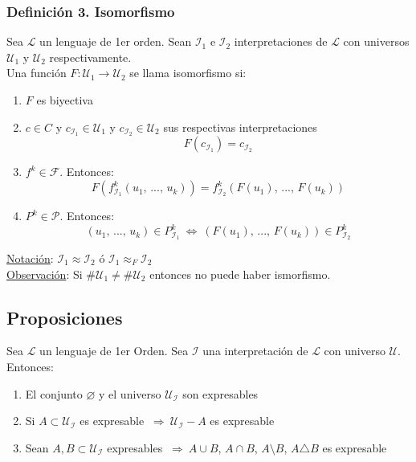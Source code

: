 \documentclass{article}
\newcommand{\comma}{,\,}                                %
\newcommand{\partes}{\mathcal{P}}
\newcommand{\familia}{\mathcal{F}}                      %
\newcommand{\lenguaje}{\mathcal{L}}
\newcommand{\interpretacion}{\mathcal{I}}
\newcommand{\universo}{\mathcal{U}}
\newcommand{\Rightarrows}{\: \Rightarrow \:}            %
\newcommand{\Leftrightarrows}{\: \Leftrightarrow \:}    %
\begin{document}
\subsubsection*{Definición 3. Isomorfismo}
Sea $\lenguaje$ un lenguaje de 1er orden. Sean $\interpretacion_1$ e $\interpretacion_2$ interpretaciones de $\lenguaje$ con universos $\universo_1$ y $\universo_2$ respectivamente.
\\Una función $F: \universo_1 \rightarrow \universo_2$ se llama isomorfismo si:
\begin{enumerate}
    \item $F$ es biyectiva
    \item $c \in C$ y $c_{\interpretacion_1} \in \universo_1$ y $c_{\interpretacion_2} \in \universo_2$ sus respectivas interpretaciones
    \begin{equation*}
        F(c_{\interpretacion_1}) = c_{\interpretacion_2}
    \end{equation*}
    \item $f^k \in \familia$. Entonces:
    \begin{equation*}
        F(f^k_{\interpretacion_1}(u_1 \comma ... \comma u_k)) = f^k_{\interpretacion_2} (F(u_1) \comma ... \comma F(u_k))
    \end{equation*}
    \item $P^k \in \partes$. Entonces:
    \begin{equation*}
        (u_1 \comma ... \comma u_k) \in P^k_{\interpretacion_1} \Leftrightarrows (F(u_1) \comma ... \comma F(u_k)) \in P^k_{\interpretacion_2}
    \end{equation*}
\end{enumerate}
\underline{Notación}: $\interpretacion_1 \approx \interpretacion_2$ ó $\interpretacion_1 \approx_F \interpretacion_2$ 
\\\underline{Observación}: Si $\#\universo_1 \neq \#\universo_2$ entonces no puede haber ismorfismo.

\subsection{Proposiciones}
Sea $\lenguaje$ un lenguaje de 1er Orden. Sea $\interpretacion$ una interpretación de $\lenguaje$ con universo $\universo$. 
\\Entonces:
\begin{enumerate}
    \item El conjunto $\varnothing$ y el universo $\universo_\interpretacion$ son expresables
    \item Si $A \subset \universo_\interpretacion$ es expresable $\Rightarrows \universo_\interpretacion - A$ es expresable
    \item Sean $A, B \subset \universo_\interpretacion$ expresables $\Rightarrows A \cup B$, $A \cap B$, $A \setminus B$, $A \triangle B$ es expresable
\end{enumerate}
\end{document}
